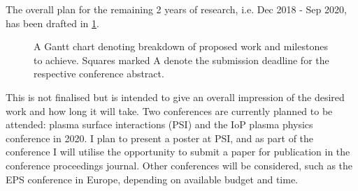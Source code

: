 \documentclass[a4paper, 12pt]{article} %
\begin{document}
	The overall plan for the remaining 2 years of research, i.e. Dec 2018 - Sep 2020, has been drafted in \cref{fig:timeline}.
	\begin{figure}[t]
		\vspace{-0pt}
		\caption{A Gantt chart denoting breakdown of proposed work and milestones to achieve. Squares marked A denote the submission deadline for the respective conference abstract.}
		\label{fig:timeline} 
	\end{figure}
	This is not finalised but is intended to give an overall impression of the desired work and how long it will take. 
	Two conferences are currently planned to be attended: plasma surface interactions (PSI) and the IoP plasma physics conference in 2020.
	I plan to present a poster at PSI, and as part of the conference I will utilise the opportunity to submit a paper for publication in the conference proceedings journal.
	Other conferences will be considered, such as the EPS conference in Europe, depending on available budget and time.



\begingroup
{}
\setlength\bibitemsep{3.5pt}
\printbibliography
\endgroup
%
%

\end{document}
